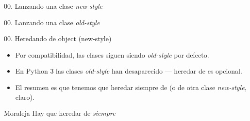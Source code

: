 \begin{frame}{00. Lanzando una clase \textit{new-style}}
\end{frame}

\begin{frame}{00. Lanzando una clase \textit{old-style}}
\end{frame}

\begin{frame}{00. Heredando de object (new-style)}
  \begin{itemize}
    \item Por compatibilidad, las clases siguen siendo
      \textit{old-style} por defecto.
    \item En Python 3 las clases \textit{old-style} han desaparecido —
      heredar de  es opcional.
    \item El resumen es que tenemos que heredar siempre de
       (o de otra clase \textit{new-style}, claro).
  \end{itemize}

  \begin{alertblock}{\centering Moraleja}
    \centering Hay que heredar de  \emph{siempre}
  \end{alertblock}
\end{frame}
